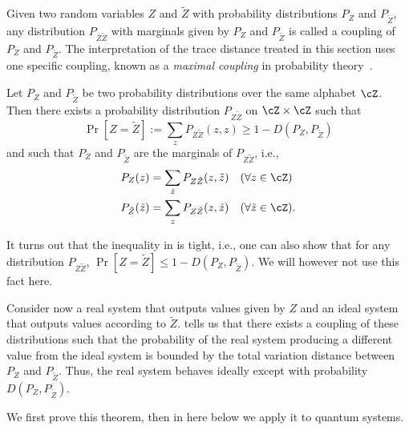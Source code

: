 Given two random variables $Z$ and $\tilde{Z}$ with probability
distributions $P_Z$ and $P_{\tilde{Z}}$, any distribution
$P_{Z\tilde{Z}}$ with marginals given by $P_Z$ and $P_{\tilde{Z}}$ is
called a coupling of $P_Z$ and $P_{\tilde{Z}}$. The interpretation of
the trace distance treated in this section uses one specific coupling,
known as a \emph{maximal coupling} in probability theory~\cite{Tho00}.

\begin{thm} \label{thm:difference}
  Let $P_Z$ and $P_{\tilde{Z}}$ be two probability distributions over
  the same alphabet $\cZ$. Then there exists a probability
  distribution $P_{Z \tilde{Z}}$ on $\cZ \times \cZ$ such that
  \begin{equation} \label{eq:equalityprob}
    \Pr[Z  = \tilde{Z}] := \sum_{z} P_{Z \tilde{Z}}(z, z) \geq 1-  D(P_Z, P_{\tilde{Z}}) 
  \end{equation}
  and such that $P_Z$ and $P_{\tilde{Z}}$ are the marginals of $P_{Z
    \tilde{Z}}$, i.e., 
  \begin{align} \label{eq:marginal1}
    P_Z(z) & = \sum_{\tilde{z}} P_{Z \tilde{Z}}(z,\tilde{z})  \quad
    (\forall z \in \cZ)
    \\ \label{eq:marginal2}
    P_{\tilde{Z}}(\tilde{z}) & = \sum_z P_{Z \tilde{Z}}(z,\tilde{z})
    \quad (\forall \tilde{z} \in \cZ) .
  \end{align}
\end{thm}

It turns out that the inequality in  is tight,
i.e., one can also show that for any distribution $P_{Z\tilde{Z}}$,
$\Pr[Z = \tilde{Z}] \leq 1 - D(P_Z, P_{\tilde{Z}})$. We will however
not use this fact here.

Consider now a real system that outputs values given by $Z$ and an
ideal system that outputs values according to
$\tilde{Z}$.  tells us that there exists a
coupling of these distributions such that the probability of the real
system producing a different value from the ideal system is bounded by
the total variation distance between $P_Z$ and $P_{\tilde{Z}}$. Thus,
the real system behaves ideally except with probability $D(P_Z,
P_{\tilde{Z}})$.

We first prove this theorem, then in  here
below we apply it to quantum systems.

